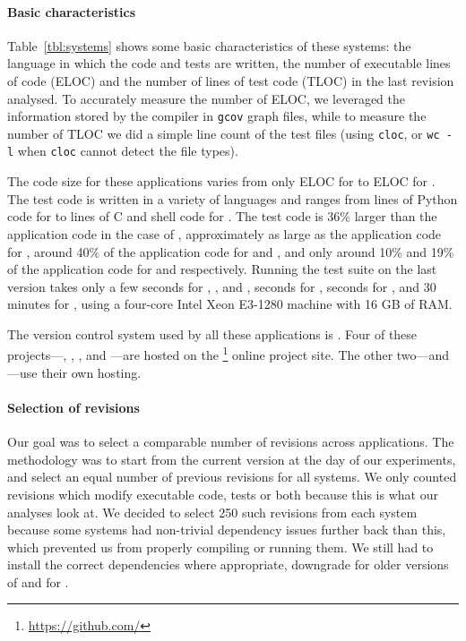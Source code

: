 \paragraph{Basic characteristics} Table~\ref{tbl:systems} shows some basic
characteristics of these systems: the language in which the code and tests are
written, the number of executable lines of code (ELOC) and the number of lines
of test code (TLOC) in the last revision analysed. To accurately measure the
number of ELOC, we leveraged the information stored by the compiler in
\texttt{gcov} graph files, while to measure the number of TLOC we did a simple
line count of the test files (using \texttt{cloc}, or \texttt{wc~-l} when
\texttt{cloc} cannot detect the file types).

The code size for these applications varies from only \memcachedSize
ELOC for \memcached to \gitSize ELOC for \git.  The test code is written in
a variety of languages and ranges from \lighttpdtwoTsize lines of Python
code for \lighttpdtwo to \gitTsize lines of C and shell code for \git.
The test code is 36\% larger than the application code in the case
of \git, approximately as large as the application code for
\memcached, around 40\% of the application code for \redis and \zeromq,
and only around 10\% and 19\% of the application code for \lighttpdtwo and
\binutils respectively.  Running the test suite on the last version 
takes only a few seconds for \binutils, \lighttpdtwo, and \zeromq,
\memcachedTestTime seconds for \memcached, \redisTestTime seconds for 
\redis, and 30 minutes for \git, using a four-core Intel Xeon 
E3-1280 machine with 16 GB of RAM.

The version control system used by all these applications is \git.  Four
of these projects---\git, \memcached, \redis, and \zeromq ---are hosted
on the \github\footnote{\url{https://github.com/}} online project site.
The other two---\binutils and \lighttpdtwo---use their own \git hosting.


\paragraph{Selection of revisions} Our goal was to select a comparable number
of revisions across applications. The methodology was to start from the current
version at the day of our experiments, and select an equal number of previous
revisions for all systems. We only counted revisions which modify executable
code, tests or both because this is what our analyses look at. We decided to
select 250 such revisions from each system because some systems had non-trivial
dependency issues further back than this, which prevented us from properly
compiling or running them.  We still had to install the correct dependencies
where appropriate, \eg downgrade  for older versions of \lighttpdtwo
and  for \memcached.

